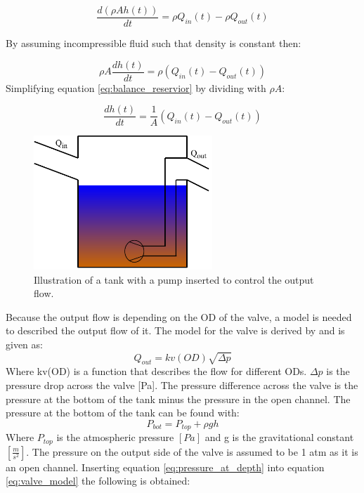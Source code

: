 \begin{equation}
		\frac{d(\rho Ah(t))}{dt}=\rho Q_{in}(t)-\rho Q_{out}(t)
\end{equation}

By assuming incompressible fluid such that density is constant then:

\begin{equation}\label{eq:balance_reservior}
	\rho A\frac{dh(t)}{dt}=\rho \left(Q_{in}(t)-Q_{out}(t)\right)
\end{equation}
Simplifying equation \ref{eq:balance_reservior} by dividing with $\rho A$:

\begin{equation}\label{eq:balance_reserviorv2}
	\frac{dh(t)}{dt}=\frac{1}{A} \left(Q_{in}(t)-Q_{out}(t)\right)
\end{equation}


\begin{figure}[H]
	\centering
	\includegraphics[width=0.60\textwidth]{report/modeling/pictures/reservior_with_pump}
	\caption{Illustration of a tank with a pump inserted to control the output flow.}
	\label{fig:reservior_with_pump}
\end{figure}

Because the output flow is depending on the OD of the valve, a model is needed to described the output flow of it. The model for the valve is derived by \cite{boysen} and is given as:
\begin{equation}\label{eq:valve_model}
	Q_{out} = kv(OD) \sqrt{\Delta p}
\end{equation}
Where kv(OD) is a function that describes the flow for different ODs. $\Delta p$ is the pressure drop across the valve [Pa]. The pressure difference across the valve is the pressure at the bottom of the tank minus the pressure in the open channel. The pressure at the bottom of the tank can be found with:
\begin{equation}\label{eq:pressure_at_depth}
 	P_{bot} = P_{top} +\rho g h
 \end{equation} 
 Where $P_{top}$ is the atmospheric pressure $[Pa]$ and g is the gravitational constant $\left[\frac{m}{s^2}\right]$. The pressure on the output side of the valve is assumed to be 1 atm as it is an open channel. Inserting equation \ref{eq:pressure_at_depth} into equation \ref{eq:valve_model} the following is obtained:    


